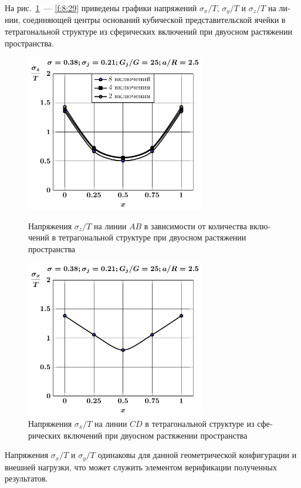 \begin{russian}
На рис.~\ref{f:8:27}~--- \ref{f:8:29} приведены графики напряжений $\sigma_x/T$, $\sigma_y/T$ и $\sigma_z/T$ на линии, соединяющей центры оснований кубической представительской ячейки в тетрагональной структуре из сферических включений при двуосном растяжении пространства.{\sloppy\par}

\begin{figure}[h!]
\centering\footnotesize
\parbox[b]{7.5cm}{\centering\includegraphics[width=7.8cm]{inc8-4-2-a25-d95-g25-sig_z-spheres-tension2.pdf}
\caption{Напряжения $\sigma_z/T$ на линии $AB$ в зависимости от количества включений в тетрагональной структуре при двуосном растяжении пространства
\label{f:8:26}}}\hfil\hfil
\parbox[b]{7.5cm}{\centering\includegraphics[width=7.8cm]{inc8-a25-d95-g25-c-c-sig_x-spheres-tension2.pdf}
\caption{Напряжения $\sigma_x/T$ на линии $CD$ в тетрагональной структуре из сферических включений при двуосном растяжении пространства
\label{f:8:27}}}
\end{figure}

Напряжения $\sigma_x/T$ и $\sigma_y/T$ одинаковы для данной геометрической конфигурации и внешней нагрузки, что может служить элементом верификации полученных результатов.


\end{russian}
